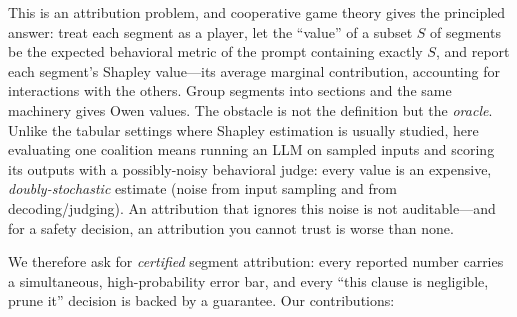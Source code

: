 \documentclass[10pt,twocolumn,letterpaper]{article}
\theoremstyle{plain}
\theoremstyle{definition}
\begin{document}
This is an attribution problem, and cooperative game theory gives the
principled answer: treat each segment as a player, let the ``value'' of a subset
$S$ of segments be the expected behavioral metric of the prompt containing
exactly $S$, and report each segment's Shapley value---its average marginal
contribution, accounting for interactions with the others. Group segments into
sections and the same machinery gives Owen values. The obstacle is not the
definition but the \emph{oracle}. Unlike the tabular settings where Shapley
estimation is usually studied, here evaluating one coalition means running an
LLM on sampled inputs and scoring its outputs with a possibly-noisy behavioral
judge: every value is an expensive, \emph{doubly-stochastic} estimate (noise
from input sampling and from decoding/judging). An attribution that ignores this
noise is not auditable---and for a safety decision, an attribution you cannot
trust is worse than none.

We therefore ask for \emph{certified} segment attribution: every reported number
carries a simultaneous, high-probability error bar, and every ``this clause is
negligible, prune it'' decision is backed by a guarantee. Our contributions:
\end{document}

